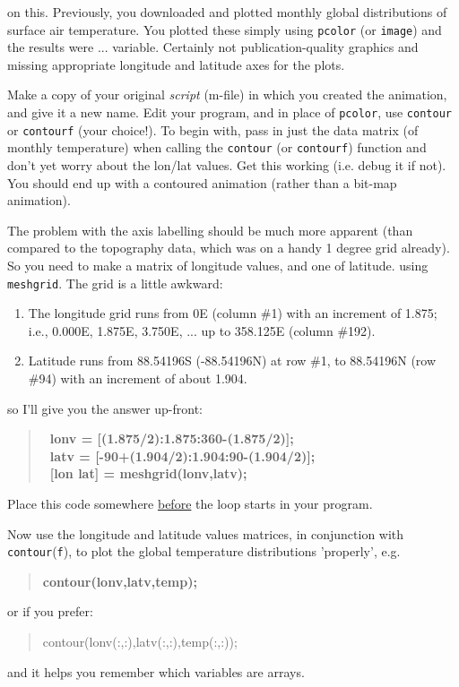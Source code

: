 \documentclass{tufte-book} %
\newenvironment{docspec}{\begin{quotation}\ttfamily\parskip0pt\parindent0pt\ignorespaces}{\end{quotation}}
\newenvironment{docspecbold}{\begin{quotation}\ttfamily\bfseries\parskip0pt\parindent0pt\ignorespaces}{\end{quotation}}
\begin{document}
 on this. Previously, you downloaded and plotted monthly global distributions of surface air temperature. You plotted these simply using \texttt{pcolor} (or \texttt{image}) and the results were ... variable. Certainly not publication-quality graphics and missing appropriate longitude and latitude axes for the plots.

Make a copy of your original \textit{script} (\textsf{m-file}) in which you created the animation, and give it a new name. Edit your program, and in place of \texttt{pcolor}, use \texttt{contour} or \texttt{contourf} (your choice!). To begin with, pass in just the data matrix (of monthly temperature) when calling the \texttt{contour} (or \texttt{contourf}) function and don't yet worry about the lon/lat values. Get this working (i.e. debug it if not). You should end up with a contoured animation (rather than a bit-map animation).

The problem with the axis labelling should be much more apparent (than compared to the topography data, which was on a handy 1 degree grid already). So you need to make a matrix of longitude values, and one of latitude. using \texttt{meshgrid}. The grid is a little awkward:
\begin{enumerate}[noitemsep]
\setlength{\itemindent}{.2in}
\item The longitude grid runs from 0\degree E (column \#1) with an increment of 1.875\degree ; i.e., 0.000\degree E, 1.875\degree E, 3.750\degree E, ... up to 358.125\degree E (column \#192).
\item Latitude runs from 88.54196\degree S (-88.54196\degree N) at row \#1, to 88.54196\degree N (row \#94) with an increment of about 1.904.
\end{enumerate}
so I'll give you the answer up-front:
\begin{docspecbold}
 \ lonv = [(1.875/2):1.875:360-(1.875/2)];
\\ \ latv = [-90+(1.904/2):1.904:90-(1.904/2)];
\\ \ [lon lat] = meshgrid(lonv,latv);
\end{docspecbold}
Place this code somewhere \uline{before} the loop starts in your program.

Now use the longitude and latitude values matrices, in conjunction with \texttt{contour}(\texttt{f}), to plot the global temperature distributions 'properly', e.g.
\begin{docspecbold}
contour(lonv,latv,temp);
\end{docspecbold}
or if you prefer:
\begin{docspec}
contour(lonv(:,:),latv(:,:),temp(:,:));
\end{docspec}
and it helps you remember which variables are arrays.
\end{document}
